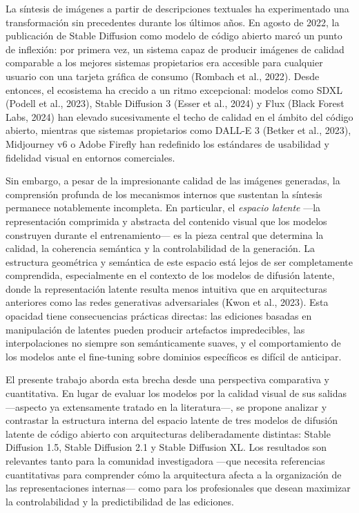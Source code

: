 \documentclass[12pt, a4paper, twoside]{book}
\begin{document}
La síntesis de imágenes a partir de descripciones textuales ha experimentado una transformación sin precedentes durante los últimos años. En agosto de 2022, la publicación de Stable Diffusion como modelo de código abierto marcó un punto de inflexión: por primera vez, un sistema capaz de producir imágenes de calidad comparable a los mejores sistemas propietarios era accesible para cualquier usuario con una tarjeta gráfica de consumo (Rombach et al., 2022). Desde entonces, el ecosistema ha crecido a un ritmo excepcional: modelos como SDXL (Podell et al., 2023), Stable Diffusion 3 (Esser et al., 2024) y Flux (Black Forest Labs, 2024) han elevado sucesivamente el techo de calidad en el ámbito del código abierto, mientras que sistemas propietarios como DALL-E 3 (Betker et al., 2023), Midjourney v6 o Adobe Firefly han redefinido los estándares de usabilidad y fidelidad visual en entornos comerciales.

Sin embargo, a pesar de la impresionante calidad de las imágenes generadas, la comprensión profunda de los mecanismos internos que sustentan la síntesis permanece notablemente incompleta. En particular, el \textit{espacio latente} ---la representación comprimida y abstracta del contenido visual que los modelos construyen durante el entrenamiento--- es la pieza central que determina la calidad, la coherencia semántica y la controlabilidad de la generación. La estructura geométrica y semántica de este espacio está lejos de ser completamente comprendida, especialmente en el contexto de los modelos de difusión latente, donde la representación latente resulta menos intuitiva que en arquitecturas anteriores como las redes generativas adversariales (Kwon et al., 2023). Esta opacidad tiene consecuencias prácticas directas: las ediciones basadas en manipulación de latentes pueden producir artefactos impredecibles, las interpolaciones no siempre son semánticamente suaves, y el comportamiento de los modelos ante el fine-tuning sobre dominios específicos es difícil de anticipar.

El presente trabajo aborda esta brecha desde una perspectiva comparativa y cuantitativa. En lugar de evaluar los modelos por la calidad visual de sus salidas ---aspecto ya extensamente tratado en la literatura---, se propone analizar y contrastar la estructura interna del espacio latente de tres modelos de difusión latente de código abierto con arquitecturas deliberadamente distintas: Stable Diffusion 1.5, Stable Diffusion 2.1 y Stable Diffusion XL. Los resultados son relevantes tanto para la comunidad investigadora ---que necesita referencias cuantitativas para comprender cómo la arquitectura afecta a la organización de las representaciones internas--- como para los profesionales que desean maximizar la controlabilidad y la predictibilidad de las ediciones.
\end{document}
